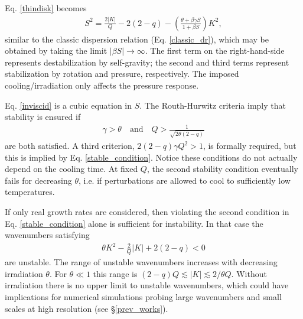 
Eq. \ref{thindisk} becomes 
\begin{align}\label{inviscid}
  S^2 = \frac{2|K|}{Q} - 2(2-q) - \left(\frac{\theta + \beta \gamma
    S}{1+\beta S}\right)K^2, 
\end{align}
similar to the classic dispersion relation
(Eq. \ref{classic_dr}), which may be obtained by taking the limit
$|\beta S|\to\infty$. %
The first term on the right-hand-side represents destabilization by self-gravity; 
the second and third terms represent stabilization by rotation and
pressure, respectively. The imposed cooling/irradiation only affects the
pressure response. %

Eq. \ref{inviscid} is a cubic equation in $S$. The 
Routh-Hurwitz criteria imply that stability is ensured if 
\begin{align}\label{stable_condition}
  \gamma > \theta \quad \text{and} \quad 
  Q > \frac{1}{\sqrt{2\theta(2-q)}} 
\end{align}
are both satisfied. 
A third criterion, $2(2-q)\gamma Q^2>1$, is formally required, but this
is implied by Eq. \ref{stable_condition}. 
Notice these conditions do not actually depend on the cooling time. 
At fixed $Q$, the second stability condition eventually fails for
decreasing $\theta$, i.e. if perturbations are allowed
to cool to sufficiently low temperatures.  


If only real growth rates are considered, then violating the second
condition in Eq. \ref{stable_condition} alone is sufficient for instability. 
In that case the wavenumbers satisfying
\begin{align}
  \theta K^2 - \frac{2}{Q}|K| + 2(2-q) < 0 
\end{align}
are unstable. The range of unstable wavenumbers
increases with decreasing irradiation $\theta$. For $\theta\ll 1$ this range is 
$(2-q)Q\lesssim|K|\lesssim2/\theta Q$. Without irradiation there is no
upper limit to unstable wavenumbers, which could have implications for
numerical simulations probing large wavenumbers and small scales 
at high resolution (see \S\ref{prev_works}). 

